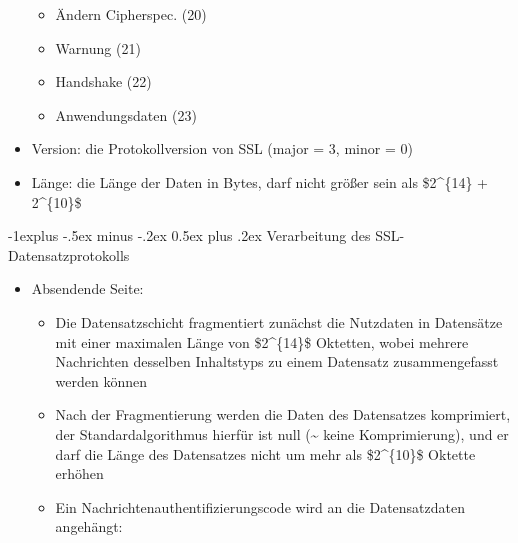 \documentclass[a4paper]{article}
\makeatletter
\renewcommand{\subsection}{\@startsection{subsection}{2}{0mm}%
 {-1explus -.5ex minus -.2ex}%
 {0.5ex plus .2ex}%
 {\normalfont\normalsize\bfseries}}
\makeatother
\begin{document}
\begin{multicols}{3}
\begin{itemize}
              \begin{itemize}
                  \item
                        Ändern Cipherspec. (20)
                  \item
                        Warnung (21)
                  \item
                        Handshake (22)
                  \item
                        Anwendungsdaten (23)
              \end{itemize}
        \item
              Version: die Protokollversion von SSL (major = 3, minor = 0)
        \item
              Länge: die Länge der Daten in Bytes, darf nicht größer sein als
              \$2\^{}\{14\} + 2\^{}\{10\}\$
    \end{itemize}


    \subsection{Verarbeitung des
        SSL-Datensatzprotokolls}

    \begin{itemize}
        \item
              Absendende Seite:

              \begin{itemize}
                  \item
                        Die Datensatzschicht fragmentiert zunächst die Nutzdaten in
                        Datensätze mit einer maximalen Länge von \$2\^{}\{14\}\$ Oktetten,
                        wobei mehrere Nachrichten desselben Inhaltstyps zu einem Datensatz
                        zusammengefasst werden können
                  \item
                        Nach der Fragmentierung werden die Daten des Datensatzes
                        komprimiert, der Standardalgorithmus hierfür ist null
                        (\textasciitilde{} keine Komprimierung), und er darf die Länge des
                        Datensatzes nicht um mehr als \$2\^{}\{10\}\$ Oktette erhöhen
                  \item
                        Ein Nachrichtenauthentifizierungscode wird an die Datensatzdaten
                        angehängt:


\end{itemize}
\end{itemize}
\end{multicols}
\end{document}
